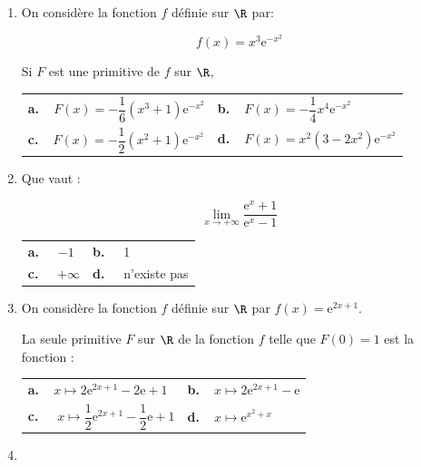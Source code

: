 \begin{enumerate}
\begin{center}
\begin{tabularx}{\linewidth}{*{2}{X}}
$x = -1$
\end{tabularx}
\end{center}


\item On considère la fonction $f$ définie sur $\R$ par:

\[f(x) = x^3\text{e}^{-x^2}\]

Si $F$ est une primitive de $f$ sur $\R$, 

\begin{center}
\renewcommand\arraystretch{1.9}
\begin{tabularx}{\linewidth}{*{2}{X}}
\textbf{a.~~}$F(x) = - \dfrac16\left(x^3 + 1\right)\text{e}^{-x^2}$ &
\textbf{b.~~}$F(x) = - \dfrac14 x^4\text{e}^{-x^2}$\\
\textbf{c.~~}$F(x)=-\dfrac12\left(x^2 + 1\right)\text{e}^{-x^2}$&
\textbf{d.~~}$F(x)= x^2\left(3 - 2x^2\right)\text{e}^{-x^2}$
\end{tabularx}
\renewcommand\arraystretch{1}
\end{center}

\item Que vaut :

\[\displaystyle\lim_{x \to + \infty} \dfrac{\text{e}^x + 1}{\text{e}^x - 1}\]

\begin{center}
\begin{tabularx}{\linewidth}{*{2}{X}}
\textbf{a.~~} $-1$&\textbf{b.~~}  1\\
\textbf{c.~~} $+ \infty$&\textbf{d.~~} n'existe pas
\end{tabularx}
\end{center}

\item On considère la fonction $f$ définie sur $\R$ par $f(x) = \text{e}^{2x +1}$.

La seule primitive $F$ sur $\R$ de la fonction $f$ telle que $F(0) = 1$ est la fonction :

\begin{center}
\begin{tabularx}{\linewidth}{*{2}{X}}
\textbf{a.~~}$x \longmapsto  2\text{e}^{2x+1} - 2\text{e} + 1$&\textbf{b.~~}$x \longmapsto  2\text{e}^{2x+1} - \text{e}$\\
\textbf{c.~~} $x \longmapsto \dfrac12\text{e}^{2x+1} - \dfrac12 \text{e} + 1$&\textbf{d.~~}$x \longmapsto \text{e}^{x^2 + x}$
\end{tabularx}
\end{center}

\item ~


\end{enumerate}
